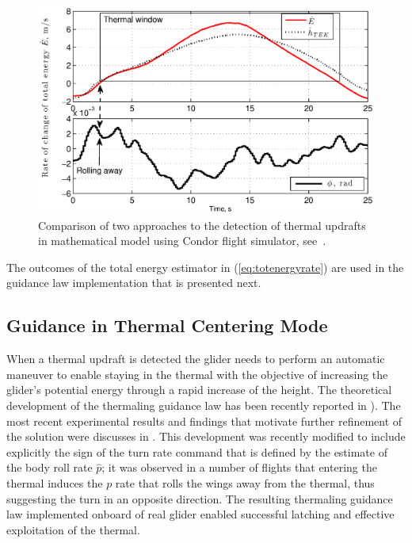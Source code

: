 \documentclass{ifacconf}
\begin{document}
\begin{figure}[thpb]
  \centering
  \includegraphics[scale=0.49]{Figures/TEK_Bank.eps}
  \caption{Comparison of two approaches to the detection of thermal updrafts in mathematical model using Condor flight simulator, see~\cite{Condor:2013:Online}. }
  \label{fig:ThermalDetection}
\end{figure}

The outcomes of the total energy estimator in (\ref{eq:totenergyrate}) are used in the guidance law implementation that is presented next.

\subsection{Guidance in Thermal Centering Mode}
\label{subsec:ThermGuidance}

When a thermal updraft is detected the glider needs to perform an automatic maneuver to enable staying in the thermal with the objective of increasing the glider's potential energy through a rapid increase of the height. The theoretical development of the thermaling guidance law has been recently reported in \cite{AKlass_JGCD:2012}). The most recent experimental results and findings that motivate further refinement of the solution were discusses in \cite{AKlass_CDC:2012}. This development was recently modified to include explicitly the sign of the turn rate command that is defined by the estimate of the body roll rate $\hat{p}$; it was observed in a number of flights that entering the thermal induces the $p$ rate that rolls the wings away from the thermal, thus suggesting the turn in an opposite direction. The resulting thermaling guidance law implemented onboard of real glider enabled successful latching and effective exploitation of the thermal.
\end{document}
